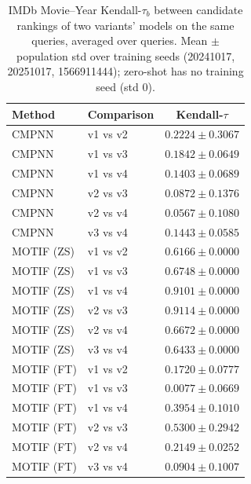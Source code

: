 \begin{table}[t]
\centering
\small
\begin{tabular}{||l||l||c||}
\hline
\textbf{Method} & \textbf{Comparison} & \textbf{Kendall-$\tau$} \\
\hline\hline
CMPNN & v1 vs v2 & $0.2224 \pm 0.3067$ \\
\hline
CMPNN & v1 vs v3 & $0.1842 \pm 0.0649$ \\
\hline
CMPNN & v1 vs v4 & $0.1403 \pm 0.0689$ \\
\hline
CMPNN & v2 vs v3 & $0.0872 \pm 0.1376$ \\
\hline
CMPNN & v2 vs v4 & $0.0567 \pm 0.1080$ \\
\hline
CMPNN & v3 vs v4 & $0.1443 \pm 0.0585$ \\
\hline
\hline
MOTIF (ZS) & v1 vs v2 & $0.6166 \pm 0.0000$ \\
\hline
MOTIF (ZS) & v1 vs v3 & $0.6748 \pm 0.0000$ \\
\hline
MOTIF (ZS) & v1 vs v4 & $0.9101 \pm 0.0000$ \\
\hline
MOTIF (ZS) & v2 vs v3 & $0.9114 \pm 0.0000$ \\
\hline
MOTIF (ZS) & v2 vs v4 & $0.6672 \pm 0.0000$ \\
\hline
MOTIF (ZS) & v3 vs v4 & $0.6433 \pm 0.0000$ \\
\hline
\hline
MOTIF (FT) & v1 vs v2 & $0.1720 \pm 0.0777$ \\
\hline
MOTIF (FT) & v1 vs v3 & $0.0077 \pm 0.0669$ \\
\hline
MOTIF (FT) & v1 vs v4 & $0.3954 \pm 0.1010$ \\
\hline
MOTIF (FT) & v2 vs v3 & $0.5300 \pm 0.2942$ \\
\hline
MOTIF (FT) & v2 vs v4 & $0.2149 \pm 0.0252$ \\
\hline
MOTIF (FT) & v3 vs v4 & $0.0904 \pm 0.1007$ \\
\hline
\end{tabular}
\caption{IMDb Movie--Year Kendall-$\tau_b$ between candidate rankings of two variants' models on the same queries, averaged over queries. Mean $\pm$ population std over training seeds (20241017, 20251017, 1566911444); zero-shot has no training seed (std 0). }
\label{tab:imdb_movie_year_seed_invariance}
\end{table}
